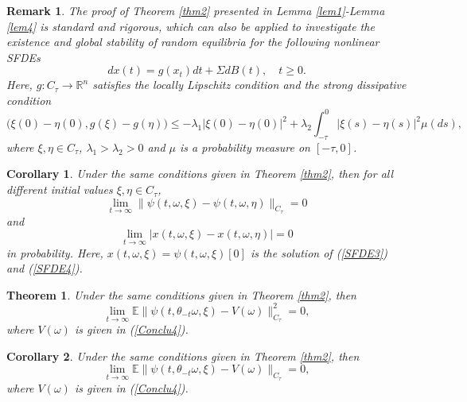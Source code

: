 \documentclass[preprint,12pt]{elsarticle}
\newtheorem{theorem}{Theorem}[section]
\newtheorem{corollary}{Corollary}[section]
\newtheorem{remark}{Remark}[section]
\begin{document}
\begin{remark}
{\rm The proof of Theorem \ref{thm2} presented in Lemma \ref{lem1}-Lemma \ref{lem4} is standard and rigorous, which can also be applied to investigate the existence and global stability of random equilibria for the following nonlinear SFDEs
\begin{equation}\label{SFDE3-2}
  dx(t)=g(x_t)dt+\Sigma dB(t),\quad t\geq0.
\end{equation}
Here, $g:C_\tau\rightarrow\mathbb{R}^n$ satisfies the locally Lipschitz condition and the strong dissipative condition
\[\bigl(\xi(0)-\eta(0),g(\xi)-g(\eta)\bigr)\leq-\lambda_1|\xi(0)-\eta(0)|^2+\lambda_2\int_{-\tau}^0|\xi(s)-\eta(s)|^2\mu(ds),\]
where $\xi,\eta\in C_\tau$, $\lambda_1>\lambda_2>0$ and $\mu$ is a probability measure on $[-\tau,0]$.
}
\end{remark}


\begin{corollary}\label{cor2-1} Under the same conditions given in Theorem \ref{thm2}, then for all different initial values $\xi,\eta\in C_\tau$,
\begin{equation}\label{Conclu4-1}
\lim_{t\rightarrow\infty}\|\psi(t,\omega,\xi)-\psi(t,\omega,\eta)\|_{C_\tau}=0
\end{equation}
and
\begin{equation}\label{Conclu4-2}
\lim_{t\rightarrow\infty}|x(t,\omega,\xi)-x(t,\omega,\eta)|=0
\end{equation}
in probability. Here, $x(t,\omega,\xi)=\psi(t,\omega,\xi)[0]$ is the solution of (\ref{SFDE3}) and (\ref{SFDE4}).
\end{corollary}



\begin{theorem}\label{thm3} Under the same conditions given in Theorem \ref{thm2}, then
\begin{equation}\label{Conclu5}
\lim_{t\rightarrow\infty}\mathbb{E}\|\psi(t,\theta_{-t}\omega,\xi)-V(\omega)\|^2_{C_\tau}=0,
\end{equation}
where $V(\omega)$ is given in (\ref{Conclu4}).
\end{theorem}

\begin{corollary}\label{cor2} Under the same conditions given in Theorem \ref{thm2}, then
\begin{equation}\label{Conclu6}
\lim_{t\rightarrow\infty}\mathbb{E}\|\psi(t,\theta_{-t}\omega,\xi)-V(\omega)\|_{C_\tau}=0,
\end{equation}
where $V(\omega)$ is given in (\ref{Conclu4}).
\end{corollary}
\end{document}
